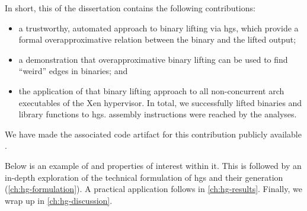 In short, this  of the dissertation contains the following contributions:
\begin{itemize}
  \item a trustworthy, automated approach to binary lifting via \glspl{hg}, which provide a formal overapproximative relation between the binary and the lifted output;
  \item a demonstration that overapproximative binary lifting can be used to find ``weird'' edges in binaries; and
  \item the application of that binary lifting approach to all non-concurrent \gls{arch} executables of the Xen hypervisor.
  In total, we successfully lifted  binaries and  library functions to \glspl{hg}.
  assembly instructions were reached by the analyses.
\end{itemize}
\begin{comment}
  The work was developed in collaboration with Dr.~Freek Verbeek, with the case study application being primarily done by me.
\end{comment}
We have made the associated code artifact for this contribution publicly available \autocite{bockenek2022artifact}.

Below is an example of  and properties of interest within it.
This  is followed by an in-depth exploration of the technical formulation of \glspl{hg} and their generation (\cref{ch:hg-formulation}).
A practical application follows in \cref{ch:hg-results}.
Finally, we wrap up in \cref{ch:hg-discussion}.

